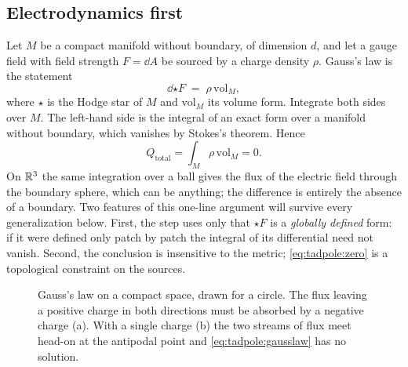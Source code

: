\subsection{Electrodynamics first}
Let $M$ be a compact manifold without boundary, of dimension $d$, and let a gauge field with
field strength $F=\dd A$ be sourced by a charge density $\rho$. Gauss's law is the statement
\begin{equation}\label{eq:tadpole:gausslaw}
 \dd{\star F}\;=\;\rho\,\mathrm{vol}_M ,
\end{equation}
where $\star$ is the Hodge star of $M$ and $\mathrm{vol}_M$ its volume form. Integrate both
sides over $M$. The left-hand side is the integral of an exact form over a manifold without
boundary, which vanishes by Stokes's theorem. Hence
\begin{equation}\label{eq:tadpole:zero}
 Q_{\text{total}}=\int_M\rho\,\mathrm{vol}_M=0 .
\end{equation}
On $\mathbb{R}^3$ the same integration over a ball gives the flux of the electric field through the
boundary sphere, which can be anything; the difference is entirely the absence of a boundary.
Two features of this one-line argument will survive every generalization below. First, the
step uses only that $\star F$ is a \emph{globally defined} form: if it were defined only
patch by patch the integral of its differential need not vanish. Second, the conclusion is
insensitive to the metric; \eqref{eq:tadpole:zero} is a topological constraint on the sources.

\begin{figure}[t]
\centering
{}
\caption{Gauss's law on a compact space, drawn for a circle. The flux leaving a positive
charge in both directions must be absorbed by a negative charge (a). With a single charge
(b) the two streams of flux meet head-on at the antipodal point and
\eqref{eq:tadpole:gausslaw} has no solution.}
\label{fig:tadpole:gauss}
\end{figure}

